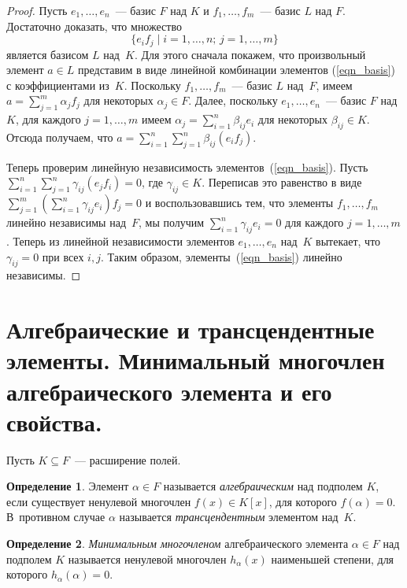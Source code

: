 \documentclass[a4paper, 12pt]{article}
\theoremstyle{definition}
\newtheorem{definition}{Определение}
\theoremstyle{remark}
\begin{document}
\begin{proof}
Пусть $e_1,\ldots,e_n$~--- базис $F$ над $K$ и $f_1,\ldots,f_m$~---
базис $L$ над $F$. Достаточно доказать, что множество
\begin{equation} \label{eqn_basis}
\lbrace e_i f_j \mid i = 1,\ldots,n;\, j = 1,\ldots, m \rbrace
\end{equation}
является базисом $L$ над~$K$. Для этого сначала покажем, что
произвольный элемент $a\in L$ представим в виде линейной комбинации
элементов (\ref{eqn_basis}) с коэффициентами из~$K$. Поскольку $f_1,
\ldots, f_m$~--- базис $L$ над~$F$, имеем $a = \sum \limits_{j=1}^m
\alpha_j f_j$ для некоторых $\alpha_j \in F$. Далее, поскольку $e_1,
\ldots, e_n$~--- базис $F$ над~$K$, для каждого $j = 1, \ldots, m$
имеем $\alpha_j = \sum \limits_{i = 1}^n \beta_{ij} e_i$ для
некоторых $\beta_{ij}\in K$. Отсюда получаем, что $a = \sum
\limits_{i=1}^n \sum \limits_{j=1}^n \beta_{ij} (e_if_j)$.

Теперь проверим линейную независимость элементов~(\ref{eqn_basis}).
Пусть $\sum \limits_{i=1}^n \sum \limits_{j=1}^n \gamma_{ij}
(e_jf_i) = 0$, где $\gamma_{ij} \in K$. Переписав это равенство в
виде $\sum \limits_{j=1}^m (\sum \limits_{i=1}^n \gamma_{ij}e_i)f_j
= 0$ и воспользовавшись тем, что элементы $f_1, \ldots, f_m$ линейно
независимы над~$F$, мы получим $\sum \limits_{i=1}^n \gamma_{ij}e_i
= 0$ для каждого $j = 1, \ldots, m$. Теперь из линейной
независимости элементов $e_1, \ldots, e_n$ над~$K$ вытекает, что
$\gamma_{ij} = 0$ при всех $i,j$. Таким образом,
элементы~(\ref{eqn_basis}) линейно независимы.
\end{proof}


\section{Алгебраические и трансцендентные элементы. Минимальный многочлен алгебраического элемента и его свойства.}

Пусть $K\subseteq F$~--- расширение полей.

\begin{definition}
Элемент $\alpha \in F$ называется {\it алгебраическим} над подполем
$K$, если существует ненулевой многочлен $f(x)\in K[x]$, для
которого $f(\alpha) = 0$. В~противном случае $\alpha$ называется
{\it трансцендентным} элементом над~$K$.
\end{definition}

\begin{definition}
{\it Минимальным многочленом} алгебраического элемента $\alpha \in
F$ над подполем $K$ называется ненулевой многочлен $h_\alpha(x)$
наименьшей степени, для которого $h_\alpha(\alpha) = 0$.
\end{definition}
\end{document}
